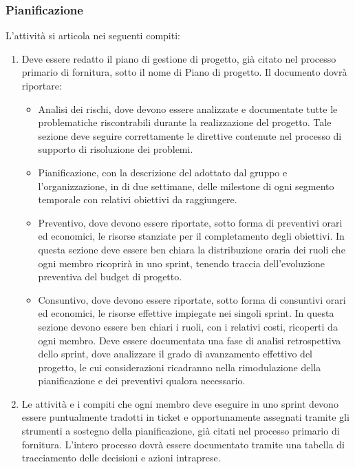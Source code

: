\subsubsection{Pianificazione}
L'attività si articola nei seguenti compiti:
\begin{enumerate}
    \item Deve essere redatto il piano di gestione di progetto, già citato nel processo primario di fornitura, sotto il nome di Piano di progetto. Il documento dovrà riportare:
\begin{itemize}
    \item Analisi dei rischi, dove devono essere analizzate e documentate tutte le problematiche riscontrabili durante la realizzazione del progetto. Tale sezione deve seguire correttamente le direttive contenute nel processo di supporto di risoluzione dei problemi.
    \item Pianificazione, con la descrizione del  adottato dal gruppo e l'organizzazione, in  di due settimane, delle milestone di ogni segmento temporale con relativi obiettivi da raggiungere.
    \item Preventivo, dove devono essere riportate, sotto forma di preventivi orari ed economici, le risorse stanziate per il completamento degli obiettivi. In questa sezione deve essere ben chiara la distribuzione oraria dei ruoli che ogni membro ricoprirà in uno sprint, tenendo traccia dell'evoluzione preventiva del budget di progetto.
    \item Consuntivo, dove devono essere riportate, sotto forma di consuntivi orari ed economici, le risorse effettive impiegate nei singoli sprint. In questa sezione devono essere ben chiari i ruoli, con i relativi costi, ricoperti da ogni membro. Deve essere documentata una fase di analisi retrospettiva dello sprint, dove analizzare il grado di avanzamento effettivo del progetto, le cui considerazioni ricadranno nella rimodulazione della pianificazione e dei preventivi qualora necessario.
\end{itemize}
    \item Le attività e i compiti che ogni membro deve eseguire in uno sprint devono essere puntualmente tradotti in ticket e opportunamente assegnati tramite gli strumenti a sostegno della pianificazione, già citati nel processo primario di fornitura. L'intero processo dovrà essere documentato tramite una tabella di tracciamento delle decisioni e azioni intraprese.
\end{enumerate}


